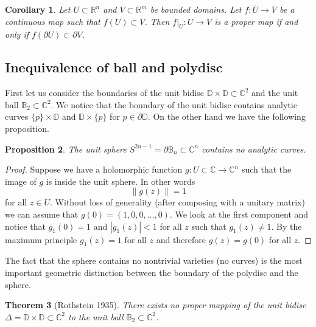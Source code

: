 \documentclass[12pt,openany]{book}
\newcommand{\abs}[1]{\left\lvert {#1} \right\rvert}
\newcommand{\norm}[1]{\left\lVert {#1} \right\rVert}
\newcommand{\C}{{\mathbb{C}}}
\newcommand{\R}{{\mathbb{R}}}
\newcommand{\bB}{{\mathbb{B}}}
\newcommand{\bD}{{\mathbb{D}}}
\theoremstyle{plain}
\newtheorem{thm}{Theorem}[section]
\newtheorem{prop}[thm]{Proposition}
\newtheorem{cor}[thm]{Corollary}
\theoremstyle{remark}
\theoremstyle{definition}
\theoremstyle{exercise}
\theoremstyle{example}
\begin{document}
\begin{cor}
Let $U \subset \R^n$ and $V \subset \R^m$ be bounded domains.
Let $f \colon \overline{U} \to \overline{V}$ be a continuous map
such that $f(U) \subset V$.
Then
$f|_U \colon U \to V$ is a proper map if and only if
$f(\partial U) \subset \partial V$.
\end{cor}

\subsection{Inequivalence of ball and polydisc}

First let us consider the boundaries of 
the unit bidisc $\bD \times \bD \subset \C^2$
and the unit ball $\bB_2 \subset \C^2$.  We notice that the boundary
of the unit bidisc contains analytic curves $\{p\} \times \bD$
and $\bD \times \{p\}$ for $p \in \partial \bD$.  On the other hand
we have the following proposition.

\begin{prop}
The unit sphere $S^{2n-1} = \partial \bB_n \subset \C^n$ 
contains no analytic curves.
\end{prop}

\begin{proof}
Suppose we have a holomorphic function $g \colon U \subset \C \to \C^n$
such that the image of $g$ is inside the unit sphere.  In other words
\begin{equation}
\norm{g(z)} = 1
\end{equation}
for all $z \in U$.  Without loss of generality (after composing with a
unitary matrix) we can assume that
$g(0) = (1,0,0,\ldots,0)$.  We look at the first component
and notice that $g_1(0) = 1$ and $\abs{g_1(z)} < 1$ for all $z$
such that $g_1(z) \not= 1$.  By the maximum principle $g_1(z) = 1$
for all $z$ and therefore $g(z) = g(0)$ for all $z$.
\end{proof}

The fact that the sphere contains no nontrivial varieties (no curves)
is the most important geometric distinction between the boundary of
the polydisc and the sphere.

\begin{thm}[Rothstein 1935]
There exists no proper mapping of the unit bidisc $\Delta = \bD \times \bD
\subset \C^2$ to the unit ball $\bB_2 \subset \C^2$.
\end{thm}
\end{document}
